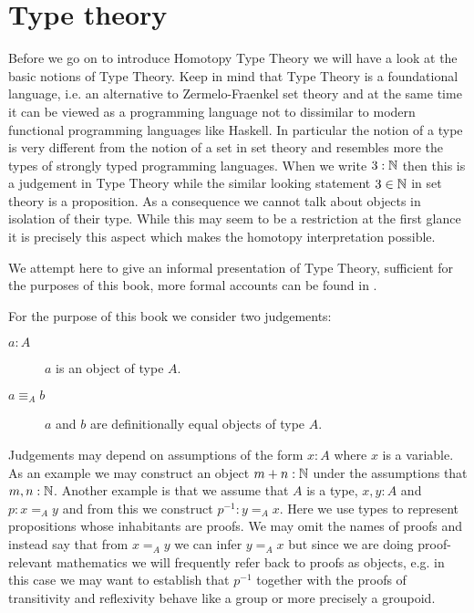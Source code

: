 \newcommand{\stype}{{\;\sf type}}
\newcommand{\rec}{{\sf rec}}
\newcommand{\bool}{{\bf B}}
\newcommand{\app}{{\sf app}}
\newcommand{\pair}{{\sf pair}}
\newcommand{\inleft}{{\sf inleft}}
\newcommand{\inright}{{\sf inright}}
\newcommand{\emptyt}{{\bf 0}}
\newcommand{\unitt}{{\bf 1}}
\newcommand{\UU}{{\mathcal U}}

\chapter{Type theory}
\label{cha:typetheory}

Before we go on to introduce Homotopy Type Theory we will have a look at
the basic notions of Type Theory. Keep in mind that Type Theory is a
foundational language, i.e. an alternative to Zermelo-Fraenkel set theory
and at the same time it can be viewed as a programming language not to
dissimilar to modern functional programming languages like Haskell. In
particular the notion of a type is very different from the notion of a
set in set theory and resembles more the types of strongly typed
programming languages. When we write $3 : \mathbb{N}$ then this is a
judgement in Type Theory while the similar looking statement $3 \in
\mathbb{N}$ in set theory is a proposition. As a consequence we cannot talk
about objects in isolation of their type. While this may seem to be a
restriction at the first glance it is precisely this aspect which
makes the homotopy interpretation possible.

We attempt here to give an informal presentation of Type Theory,
sufficient for the purposes of this book, more formal accounts can be
found in \cite{hofmann-traktat,...}.

For the purpose of this book we consider two judgements:
\begin{description}
\item[$a : A$] $a$ is an object of type $A$.
\item[$a \equiv_A b$] $a$ and $b$ are definitionally equal 
  objects of type $A$.
\end{description}
Judgements may depend on assumptions of the form $x:A$ where $x$ is a
variable. As an example we may
construct an object $m + n : \mathbb{N}$ under the assumptions that $m,n :
\mathbb{N}$. Another example is that we assume that $A $ is a type, $x,y : A$ and
$p : x =_A y$ and from this we construct $p^{-1} : y =_A x$. Here we
use types to represent propositions whose inhabitants are proofs. We
may omit the names of proofs and instead say that from $x =_A y$ we
can infer $y =_A x$ but since we are doing proof-relevant mathematics
we will frequently refer back to proofs as objects, e.g. in this case
we may want to establish that $p^{-1}$ together with the proofs of
transitivity and reflexivity behave like a group or more precisely a
groupoid.

